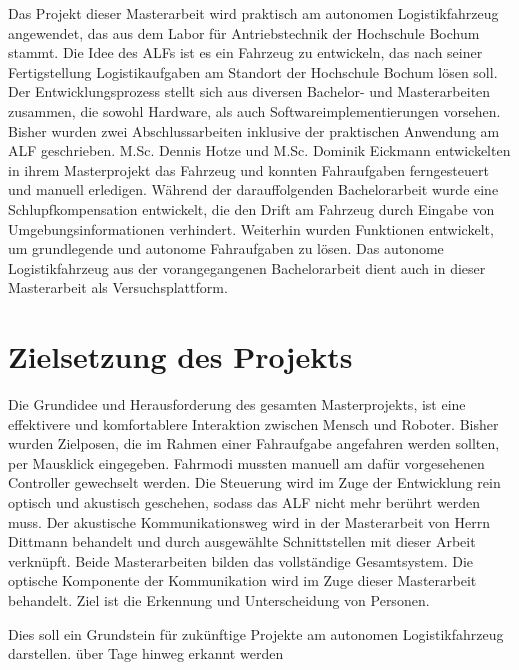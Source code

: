 		Das Projekt dieser Masterarbeit wird praktisch am autonomen Logistikfahrzeug angewendet, das aus dem Labor für Antriebstechnik der Hochschule Bochum stammt. Die Idee des ALFs ist es ein Fahrzeug zu entwickeln, das nach seiner Fertigstellung Logistikaufgaben am Standort der Hochschule Bochum lösen soll. Der Entwicklungsprozess stellt sich aus diversen Bachelor- und Masterarbeiten zusammen, die sowohl Hardware, als auch Softwareimplementierungen vorsehen. Bisher wurden zwei Abschlussarbeiten inklusive der praktischen Anwendung am ALF geschrieben. M.Sc. Dennis Hotze und M.Sc. Dominik Eickmann entwickelten in ihrem Masterprojekt das Fahrzeug und konnten Fahraufgaben ferngesteuert und manuell erledigen. Während der darauffolgenden Bachelorarbeit wurde eine Schlupfkompensation entwickelt, die den Drift am Fahrzeug durch Eingabe von Umgebungsinformationen verhindert. Weiterhin wurden Funktionen entwickelt, um grundlegende und autonome Fahraufgaben zu lösen. Das autonome Logistikfahrzeug aus der vorangegangenen Bachelorarbeit dient auch in dieser Masterarbeit als Versuchsplattform. 
	
	\section{Zielsetzung des Projekts}
	\label{sec: Zielsetzung}
		Die Grundidee und Herausforderung des gesamten Masterprojekts, ist eine effektivere und komfortablere Interaktion zwischen Mensch und Roboter. Bisher wurden Zielposen, die im Rahmen einer Fahraufgabe angefahren werden sollten, per Mausklick eingegeben. Fahrmodi mussten manuell am dafür vorgesehenen Controller gewechselt werden. Die Steuerung wird im Zuge der Entwicklung rein optisch und akustisch geschehen, sodass das ALF nicht mehr berührt werden muss. Der akustische Kommunikationsweg wird in der Masterarbeit von Herrn Dittmann behandelt und durch ausgewählte Schnittstellen mit dieser Arbeit verknüpft. Beide Masterarbeiten bilden das vollständige Gesamtsystem. Die optische Komponente der Kommunikation wird im Zuge dieser Masterarbeit behandelt. Ziel ist die Erkennung und Unterscheidung von Personen.
		
		 Dies soll ein Grundstein für zukünftige Projekte am autonomen Logistikfahrzeug darstellen. über Tage hinweg erkannt werden\\
		
		
	